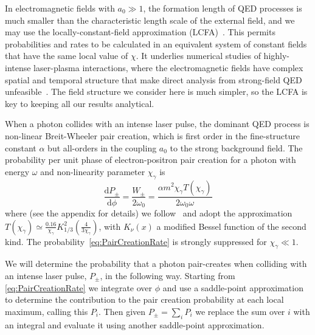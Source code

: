 \documentclass[reprint,superscriptaddress,amsmath,amssymb,aps,pra]{revtex4-1}
\newcommand{\rmd}{\mathrm{d}}
\begin{document}
In electromagnetic fields with $a_0 \gg 1$, the formation length of QED
processes is much smaller than the characteristic length scale of the
external field, and we may use the locally-constant-field approximation
(LCFA)~\cite{Ritus}. This permits probabilities and rates to be calculated
in an equivalent system of constant fields that have the same local value
of $\chi$. It underlies numerical studies of highly-intense laser-plasma
interactions, where the electromagnetic fields have complex spatial and
temporal structure that make direct analysis from strong-field QED
unfeasible~\cite{RidgersJCP,Gonoskov}. The field structure we consider
here is much simpler, so the LCFA is key to keeping all our results analytical.

When a photon collides with an intense laser pulse, the dominant
QED process is non-linear Breit-Wheeler pair creation, which is
first order in the fine-structure constant $\alpha$ but all-orders
in the coupling $a_0$ to the strong background field. The probability
per unit phase of electron-positron pair creation for a photon
with energy $\omega$ and non-linearity parameter $\chi_\gamma$ is
	\begin{equation}
	\frac{\rmd P_\pm}{\rmd\phi} = \frac{W_\pm}{2\omega_0}
		= \frac{\alpha m^2 \chi_\gamma T(\chi_\gamma)}{2 \omega_0 \omega}
	\label{eq:PairCreationRate}
	\end{equation}
where (see the appendix for details) we follow~\citet{Erber} and adopt the approximation
$T(\chi_\gamma) \simeq \tfrac{0.16}{\chi_\gamma} K_{1/3}^2(\tfrac{4}{3\chi_\gamma})$,
with $K_\nu(x)$ a modified Bessel function of the second kind. The
probability~\cref{eq:PairCreationRate} is strongly suppressed for $\chi_\gamma \ll 1$.

We will determine the probability that a photon pair-creates when colliding
with an intense laser pulse, $P_\pm$, in the following way. Starting from
\cref{eq:PairCreationRate} we integrate over $\phi$ and use a saddle-point
approximation to determine the contribution to the pair creation probability
at each local maximum, calling this $P_i$. Then given $P_\pm = \sum_i P_i$ we
replace the sum over $i$ with an integral and evaluate it using another
saddle-point approximation.
\end{document}
